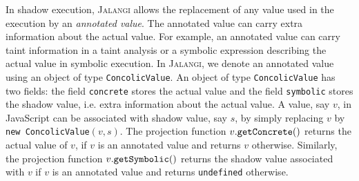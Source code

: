 \documentclass{sig-alternate}
\def\jalangi{\textsc{Jalangi}}
\newcommand \Actual{{\tt getConcrete()}}
\newcommand \Shadow{{\tt getSymbolic()}}
\begin{document}
In shadow execution, \jalangi{} allows the replacement of any value
used in the execution by an \emph{annotated value}.  The annotated
value can carry extra information about the actual value.  For
example, an annotated value can carry taint information in a taint
analysis or a symbolic expression describing the actual value in
symbolic execution.  In \jalangi{}, we denote an annotated value using
an object of type \texttt{ConcolicValue}.  An object of type
\texttt{ConcolicValue} has two fields: the field \texttt{concrete}
stores the actual value and the field \texttt{symbolic} stores the
shadow value, i.e. extra information about the actual value.  A value,
say $v$, in JavaScript can be associated with shadow value, say $s$,
by simply replacing $v$ by \texttt{new ConcolicValue}$(v, s)$.  The
projection function $v.\Actual$ returns the actual value of $v$, if
$v$ is an annotated value and returns $v$ otherwise.  Similarly, the
projection function $v.\Shadow$ returns the shadow value associated
with $v$ if $v$ is an annotated value and returns \texttt{undefined}
otherwise.





\end{document}
